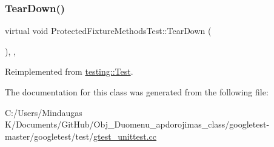 \mbox{\label{class_protected_fixture_methods_test_aa143dff0a99903cde207b6fd0042c03c}} 
\subsubsection{\texorpdfstring{TearDown()}{TearDown()}\hspace{0.1cm}{\footnotesize\ttfamily [3/3]}}
{\footnotesize\ttfamily virtual void Protected\+Fixture\+Methods\+Test\+::\+Tear\+Down (\begin{DoxyParamCaption}{ }\end{DoxyParamCaption})\hspace{0.3cm}{\ttfamily [inline]}, {\ttfamily [protected]}, {\ttfamily [virtual]}}



Reimplemented from \mbox{\hyperlink{classtesting_1_1_test_a5f0ab439802cbe0ef7552f1a9f791923}{testing\+::\+Test}}.



The documentation for this class was generated from the following file\+:\begin{DoxyCompactItemize}
\item 
C\+:/\+Users/\+Mindaugas K/\+Documents/\+Git\+Hub/\+Obj\+\_\+\+Duomenu\+\_\+apdorojimas\+\_\+class/googletest-\/master/googletest/test/\mbox{\hyperlink{googletest-master_2googletest_2test_2gtest__unittest_8cc}{gtest\+\_\+unittest.\+cc}}\end{DoxyCompactItemize}
